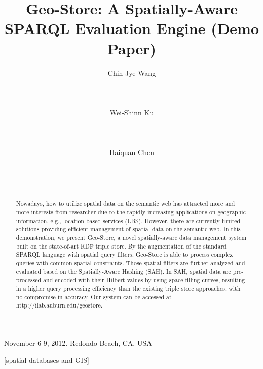 \documentclass{sig-alternate}
\begin{document}
\title{Geo-Store: A Spatially-Aware SPARQL Evaluation Engine (Demo Paper)}

\author{
\alignauthor
Chih-Jye Wang\\
    \\
    \\
    \\
\alignauthor
Wei-Shinn Ku\\
    \\
    \\
    \\
\alignauthor
Haiquan Chen\\
    \\
    \\
    \\
}

 {November 6-9, 2012. Redondo Beach, CA,
USA}

\maketitle

\begin{abstract}
Nowadays, how to utilize spatial data on the semantic web has
attracted more and more interests from researcher due to the
rapidly increasing applications on geographic information, e.g.,
location-based services (LBS). However, there are currently
limited solutions providing efficient management of spatial data
on the semantic web. In this demonstration, we present Geo-Store,
a novel spatially-aware data management system built on the
state-of-art RDF triple store. By the augmentation of the standard
SPARQL language with spatial query filters, Geo-Store is able to
process complex queries with common spatial constraints.  Those
spatial filters are further analyzed and evaluated based on the
Spatially-Aware Hashing (SAH). In SAH, spatial data are
pre-processed and encoded with their Hilbert values by using
space-filling curves, resulting in a higher query processing
efficiency than the existing triple store approaches, with no
compromise in accuracy. Our system can be accessed at
http://ilab.auburn.edu/geostore.
\end{abstract}


[spatial databases and GIS]










\balancecolumns
\end{document}
